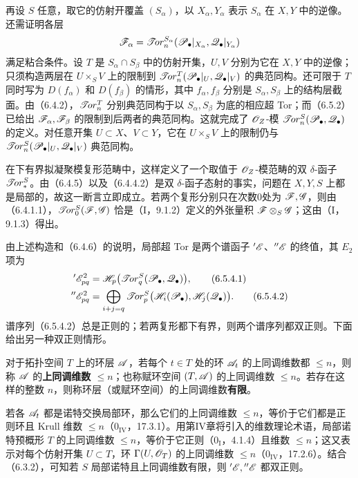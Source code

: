 再设 $S$ 任意，取它的仿射开覆盖 $(S_\alpha)$，以 $X_\alpha,Y_\alpha$ 表示 $S_\alpha$ 在 $X,Y$ 中的逆像。还需证明各层
\[
 \mathscr F_\alpha=\mathscr{T}\!or_n^{S_\alpha}
 (\mathscr P_\bullet|_{X_\alpha},\mathscr Q_\bullet|_{Y_\alpha})
\]
满足粘合条件。设 $T$ 是 $S_\alpha\cap S_\beta$ 中的仿射开集，$U,V$ 分别为它在 $X,Y$ 中的逆像；只须构造两层在 $U\times_S V$ 上的限制到 $\mathscr{T}\!or_n^T(\mathscr P_\bullet|_U,\mathscr Q_\bullet|_V)$ 的典范同构。还可限于 $T$ 同时写为 $D(f_\alpha)$ 和 $D(f_\beta)$ 的情形，其中 $f_\alpha,f_\beta$ 分别是 $S_\alpha,S_\beta$ 上的结构层截面。由（6.4.2），$\mathscr{T}\!or_n^T$ 分别典范同构于以 $S_\alpha,S_\beta$ 为底的相应超 Tor；而（6.5.2）已给出 $\mathscr F_\alpha,\mathscr F_\beta$ 的限制到后两者的典范同构。这就完成了 $\mathscr O_Z$-模 $\mathscr{T}\!or_n^S(\mathscr P_\bullet,\mathscr Q_\bullet)$ 的定义。对任意开集 $U\subset X$、$V\subset Y$，它在 $U\times_S V$ 上的限制仍与 $\mathscr{T}\!or_n^S(\mathscr P_\bullet|_U,\mathscr Q_\bullet|_V)$ 典范同构。

在下有界拟凝聚模复形范畴中，这样定义了一个取值于 $\mathscr O_Z$-模范畴的双 $\delta$-函子 $\mathscr{T}\!or_*^S$。由（6.4.5）以及（6.4.4.2）是双 $\delta$-函子态射的事实，问题在 $X,Y,S$ 上都是局部的，故这一断言立即成立。若两个复形分别只在次数0处为 $\mathscr F,\mathscr G$，则由（6.4.1.1），$\mathscr{T}\!or_0^S(\mathscr F,\mathscr G)$ 恰是（I，9.1.2）定义的外张量积 $\mathscr F\otimes_S\mathscr G$；这由（I，9.1.3）得出。

由上述构造和（6.4.6）的说明，局部超 Tor 是两个谱函子 ${}'\mathscr E$、${}''\mathscr E$ 的终值，其 $E_2$ 项为
\begin{align}
 {}'\mathscr E^2_{pq}&=\mathscr H_p\bigl(\mathscr{T}\!or_q^S(\mathscr P_\bullet,\mathscr Q_\bullet)\bigr),
 \tag{6.5.4.1}\\
 {}''\mathscr E^2_{pq}&=\bigoplus_{i+j=q}\mathscr{T}\!or_p^S
 \bigl(\mathscr H_i(\mathscr P_\bullet),\mathscr H_j(\mathscr Q_\bullet)\bigr).
 \tag{6.5.4.2}
\end{align}
谱序列（6.5.4.2）总是正则的；若两复形都下有界，则两个谱序列都双正则。下面给出另一种双正则情形。

对于拓扑空间 $T$ 上的环层 $\mathscr A$，若每个 $t\in T$ 处的环 $\mathscr A_t$ 的上同调维数都 $\leq n$，则称 $\mathscr A$ 的\textbf{上同调维数 $\leq n$}；也称赋环空间 $(T,\mathscr A)$ 的上同调维数 $\leq n$。若存在这样的整数 $n$，则称环层（或赋环空间）的上同调维数\textbf{有限}。

若各 $\mathscr A_t$ 都是诺特交换局部环，那么它们的上同调维数 $\leq n$，等价于它们都是正则环且 Krull 维数 $\leq n$（$0_{\mathrm{IV}}$，17.3.1）。用第IV章将引入的维数理论术语，局部诺特预概形 $T$ 的上同调维数 $\leq n$，等价于它正则（$0_{\mathrm I}$，4.1.4）且维数 $\leq n$；这又表示对每个仿射开集 $U\subset T$，环 $\Gamma(U,\mathscr O_T)$ 的上同调维数 $\leq n$（$0_{\mathrm{IV}}$，17.2.6）。结合（6.3.2），可知若 $S$ 局部诺特且上同调维数有限，则 ${}'\mathscr E,{}''\mathscr E$ 都双正则。

